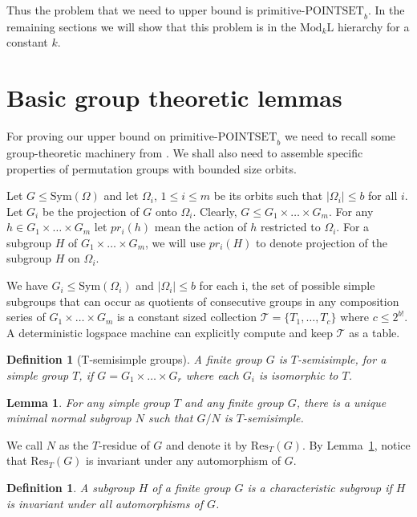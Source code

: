 \documentclass[11pt]{article}
\newtheorem{lemma}[theorem]{Lemma}
\newtheorem{definition}[theorem]{Definition}
\newcommand{\Mod}[1]{\ensuremath{\mathrm{Mod}_{#1}\mathrm{L}}}
\newcommand{\prpsb}[1]{\ensuremath{\textrm{primitive-POINTSET}_{#1}}}
\newcommand{\Res}[2]{\ensuremath{\mathrm{Res}_{#1}\left({#2}\right)}}
\newcommand{\Sym}[1]{\ensuremath{\mathrm{Sym}\left({#1}\right)}}
\newcommand{\pr}[2]{\ensuremath{pr_{#1}\left({#2}\right)}}
\begin{document}
Thus the problem that we need to upper bound is $\prpsb{b}$.  In the
remaining sections we will show that this problem is in the $\Mod{k}$
hierarchy for a constant $k$.
 
\section{Basic group theoretic lemmas}

For proving our upper bound on $\prpsb{b}$ we need to recall some
group-theoretic machinery from \cite{luks}. We shall also need to
assemble specific properties of permutation groups with bounded size
orbits.

Let $G \leq \Sym{\Omega}$ and let $\Omega_i$, $1 \leq i \leq m$ be its
orbits such that $\vert \Omega_i \vert \leq b$ for all $i$. Let $G_i$
be the projection of $G$ onto $\Omega_i$. Clearly, $G \leq G_1\times
\ldots\times G_m$. For any $h \in G_1 \times \ldots \times G_m$ let
$\pr{i}{h}$ mean the action of $h$ restricted to $\Omega_i$. For a
subgroup $H$ of $G_1 \times \ldots \times G_m$, we will use
$\pr{i}{H}$ to denote projection of the subgroup $H$ on $\Omega_i$.

We have $G_i \leq \Sym{\Omega_i}$ and $\vert \Omega_i \vert \leq b$
for each i, the set of possible simple subgroups that can occur as
quotients of consecutive groups in any composition series of
$G_1\times \ldots \times G_m$ is a constant sized collection
$\mathcal{T} = \{ T_1,\ldots, T_c\}$ where $ c \leq 2 ^{b!}$. A
deterministic logspace machine can explicitly compute and keep
$\mathcal{T}$ as a table.

\begin{definition}[T-semisimple groups]
  A finite group $G$ is \emph{$T$-semisimple}, for a simple group $T$,
  if $G = G_1 \times \ldots\times G_r$ where each $G_i$ is isomorphic
  to $T$.
\end{definition}

\begin{lemma}{\rm\cite{luks}}\label{lem-unique-res}
  For any simple group $T$ and any finite group $G$, there is a unique
  minimal normal subgroup $N$ such that $G/N$ is $T$-semisimple.
\end{lemma}

 We call $N$ as the $T$-residue of $G$ and denote it by $\Res{T}{G}$.
By Lemma~\ref{lem-unique-res}, notice that $\Res{T}{G}$ is invariant
under any automorphism of $G$.

\begin{definition}
  A subgroup $H$ of a finite group $G$ is a \emph{characteristic subgroup} if
  $H$ is invariant under all automorphisms of $G$.
\end{definition}
\end{document}
